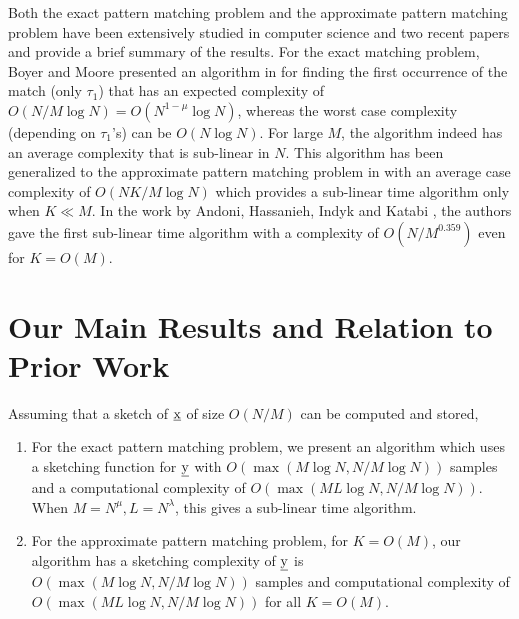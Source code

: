 Both the exact pattern matching problem and the approximate pattern matching problem have been extensively studied in computer science and two recent papers \cite{andoni2013shift} and \cite{amir2004faster} provide a brief summary of the results. For the exact matching problem, Boyer and Moore presented an algorithm in \cite{boyer1977fast} for finding the first occurrence of the match (only $\tau_1$) that has an expected complexity of $O(N/M \log N) = O(N^{1-\mu} \log N)$, whereas the worst case complexity (depending on $\tau_1$'s) can be $O(N \log N)$. For large $M$, the algorithm indeed has an average complexity that is sub-linear in $N$. This algorithm has been generalized to the approximate pattern matching problem in \cite{chang1994approximate} with an average case complexity of $O(NK/M \log N)$ which provides a sub-linear time algorithm only when $K \ll M$. In the work by Andoni, Hassanieh, Indyk and Katabi \cite{andoni2013shift}, the authors gave the first sub-linear time algorithm with a complexity of $O(N/M^{0.359})$ even for $K = O(M)$.

\section{Our Main Results and Relation to Prior Work}
\label{sec:mainresults}
Assuming that a sketch of $\underline{\mathrm{x}}$ of size $O(N/M)$ can be computed and stored,
\begin{enumerate}
  \item For the exact pattern matching problem, we present an algorithm which uses a sketching function for $\underline{\mathrm{y}}$ with $O(\max(M \log N, N/M \log N))$ samples and a computational complexity of $O(\max(ML \log N, N/M \log N))$. When $M = N^\mu, L = N^\lambda$, this gives a sub-linear time algorithm.

  \item For the approximate pattern matching problem, for $K = O(M)$, our algorithm has a sketching complexity of $\underline{\mathrm{y}}$ is $O(\max(M \log N, N/M \log N))$ samples and computational complexity of $O(\max(ML \log N, N/M \log N))$ for all $K = O(M)$.
\end{enumerate}

